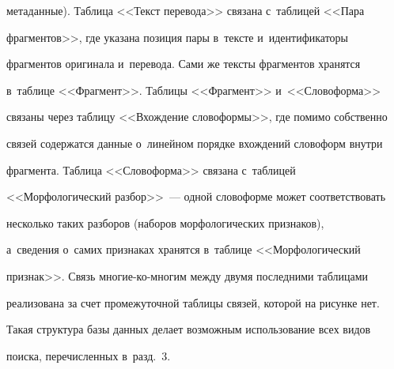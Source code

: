 метаданные). Таб\-ли\-ца <<Текст перевода>> связана с~таб\-ли\-цей <<Пара 


фрагментов>>, где указана позиция пары в~тексте и~идентификаторы 


фрагментов оригинала и~перевода. Сами же текс\-ты фрагментов хранятся 


в~таблице <<Фрагмент>>. Таб\-ли\-цы <<Фрагмент>> и~<<Словоформа>> 


связаны через таб\-ли\-цу <<Вхож\-де\-ние словоформы>>, где помимо собственно 


связей содержатся данные о~линейном порядке вхождений словоформ внутри 


фрагмента. Таб\-ли\-ца <<Словоформа>> связана с~таб\-ли\-цей 


<<Морфологический разбор>>~--- одной словоформе может соответствовать 


несколько таких разборов (наборов морфологических признаков), 


а~сведения о~самих признаках хранятся в~таб\-ли\-це <<Морфологический 


признак>>. Связь мно\-гие-ко-мно\-гим между двумя последними таб\-ли\-ца\-ми 


реализована за счет промежуточной таб\-ли\-цы связей, которой на рисунке нет. 


Такая структура базы данных делает воз\-мож\-ным использование всех видов 


поиска, пе\-ре\-чис\-лен\-ных в~разд.~3.





